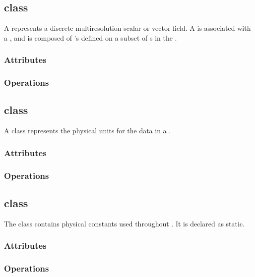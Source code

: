 \documentclass{article}
\begin{document}
\subsection{ class}

A  represents a discrete multiresolution scalar or vector
field.  A  is associated with a , and is
composed of 's defined on a subset of s in the
.

\subsubsection{Attributes}

\subsubsection{Operations}

\subsection{ class}

A  class represents the physical units for the data in a
.

\subsubsection{Attributes}

\subsubsection{Operations}

\subsection{ class}

The  class contains physical constants used throughout
\cello.  It is declared as static.

\subsubsection{Attributes}

\subsubsection{Operations}

\end{document}
